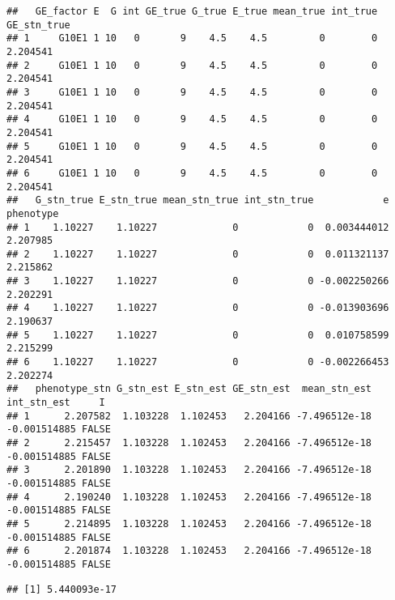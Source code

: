 \documentclass[]{article}
\newenvironment{Shaded}{\begin{snugshade}}{\end{snugshade}}
\newcommand{\CommentTok}[1]{\textcolor[rgb]{0.56,0.35,0.01}{\textit{#1}}}
\newcommand{\KeywordTok}[1]{\textcolor[rgb]{0.13,0.29,0.53}{\textbf{#1}}}
\newcommand{\NormalTok}[1]{#1}
\newcommand{\OperatorTok}[1]{\textcolor[rgb]{0.81,0.36,0.00}{\textbf{#1}}}
\newcommand{\StringTok}[1]{\textcolor[rgb]{0.31,0.60,0.02}{#1}}
\begin{document}
\begin{verbatim}
##   GE_factor E  G int GE_true G_true E_true mean_true int_true GE_stn_true
## 1     G10E1 1 10   0       9    4.5    4.5         0        0    2.204541
## 2     G10E1 1 10   0       9    4.5    4.5         0        0    2.204541
## 3     G10E1 1 10   0       9    4.5    4.5         0        0    2.204541
## 4     G10E1 1 10   0       9    4.5    4.5         0        0    2.204541
## 5     G10E1 1 10   0       9    4.5    4.5         0        0    2.204541
## 6     G10E1 1 10   0       9    4.5    4.5         0        0    2.204541
##   G_stn_true E_stn_true mean_stn_true int_stn_true            e phenotype
## 1    1.10227    1.10227             0            0  0.003444012  2.207985
## 2    1.10227    1.10227             0            0  0.011321137  2.215862
## 3    1.10227    1.10227             0            0 -0.002250266  2.202291
## 4    1.10227    1.10227             0            0 -0.013903696  2.190637
## 5    1.10227    1.10227             0            0  0.010758599  2.215299
## 6    1.10227    1.10227             0            0 -0.002266453  2.202274
##   phenotype_stn G_stn_est E_stn_est GE_stn_est  mean_stn_est  int_stn_est     I
## 1      2.207582  1.103228  1.102453   2.204166 -7.496512e-18 -0.001514885 FALSE
## 2      2.215457  1.103228  1.102453   2.204166 -7.496512e-18 -0.001514885 FALSE
## 3      2.201890  1.103228  1.102453   2.204166 -7.496512e-18 -0.001514885 FALSE
## 4      2.190240  1.103228  1.102453   2.204166 -7.496512e-18 -0.001514885 FALSE
## 5      2.214895  1.103228  1.102453   2.204166 -7.496512e-18 -0.001514885 FALSE
## 6      2.201874  1.103228  1.102453   2.204166 -7.496512e-18 -0.001514885 FALSE
\end{verbatim}

\begin{Shaded}
\end{Shaded}

\begin{verbatim}
## [1] 5.440093e-17
\end{verbatim}

\begin{Shaded}
\end{Shaded}
\end{document}
